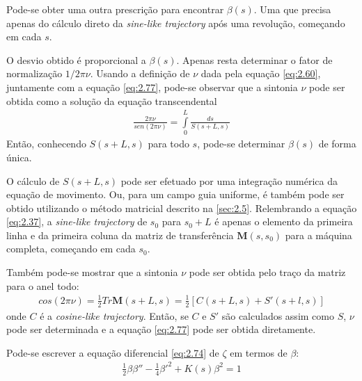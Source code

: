 Pode-se obter uma outra prescrição para encontrar $\beta(s)$. Uma que precisa apenas do cálculo direto da \textit{sine-like trajectory} após uma revolução, começando em cada $s$.

O desvio obtido é proporcional a $\beta(s)$. Apenas resta determinar o fator de normalização $1/2\pi\nu$. Usando a definição de $\nu$ dada pela equação \eqref{eq:2.60}, juntamente com a equação \eqref{eq:2.77}, pode-se observar que a sintonia $\nu$ pode ser obtida como a solução da equação transcendental
\begin{align}
	\frac{2\pi\nu}{sen(2\pi\nu)} = \int\limits_{0}^{L} \frac{ds}{S(s+L,s)}
\end{align}
Então, conhecendo $S(s+L,s)$ para todo $s$, pode-se determinar $\beta(s)$ de forma única.

O cálculo de $S(s+L,s)$ pode ser efetuado por uma integração numérica da equação de movimento. Ou, para um campo guia uniforme, é também pode ser obtido utilizando o método matricial descrito na \autoref{sec:2.5}. Relembrando a equação \eqref{eq:2.37}, a \textit{sine-like trajectory} de $s_0$ para $s_0+L$ é apenas o elemento da primeira linha e da primeira coluna da matriz de transferência $\boldsymbol{M}(s,s_0)$ para a máquina completa, começando em cada $s_0$.

Também pode-se mostrar que a sintonia $\nu$ pode ser obtida pelo traço da matriz para o anel todo:
\begin{align}
	cos(2\pi\nu) = \frac{1}{2} Tr \boldsymbol{M}(s+L,s) = \frac{1}{2}[C(s+L,s) + S'(s+l,s)]
\end{align}
onde $C$ é a \textit{cosine-like trajectory}. Então, se $C$ e $S'$ são calculados assim como $S$, $\nu$ pode ser determinada e a equação \eqref{eq:2.77} pode ser obtida diretamente.

Pode-se escrever a equação diferencial \eqref{eq:2.74} de $\zeta$ em termos de $\beta$:
\begin{align}
	\frac{1}{2}\beta\beta'' - \frac{1}{4}\beta'^2 + K(s)\beta^2 = 1\label{eq:2.80}
\end{align}

